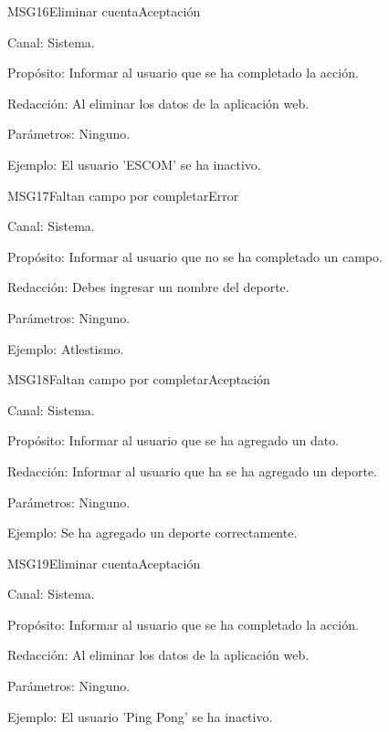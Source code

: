 \begin{mensaje}{MSG16}{Eliminar cuenta}{Aceptación}
	\item[Canal:] Sistema.
	\item[Propósito:] Informar al usuario que se ha completado la acción.
	\item[Redacción:] Al eliminar los datos de la aplicación web.
	\item[Parámetros:] Ninguno.
	\item[Ejemplo:] El usuario 'ESCOM' se ha inactivo.
\end{mensaje}
\newline



\begin{mensaje}{MSG17}{Faltan campo por completar}{Error}
	\item[Canal:] Sistema.
	\item[Propósito:] Informar al usuario que no se ha completado un campo.
	\item[Redacción:] Debes ingresar un nombre del deporte.
	\item[Parámetros:] Ninguno.
	\item[Ejemplo:] Atlestismo.
\end{mensaje}
\newline



\begin{mensaje}{MSG18}{Faltan campo por completar}{Aceptación}
	\item[Canal:] Sistema.
	\item[Propósito:] Informar al usuario que se ha agregado un dato.
	\item[Redacción:] Informar al usuario que ha se ha agregado un deporte.
	\item[Parámetros:] Ninguno.
	\item[Ejemplo:] Se ha agregado un deporte correctamente.
\end{mensaje}
\newline

\begin{mensaje}{MSG19}{Eliminar cuenta}{Aceptación}
	\item[Canal:] Sistema.
	\item[Propósito:] Informar al usuario que se ha completado la acción.
	\item[Redacción:] Al eliminar los datos de la aplicación web.
	\item[Parámetros:] Ninguno.
	\item[Ejemplo:] El usuario 'Ping Pong' se ha inactivo.
\end{mensaje}
\newline


